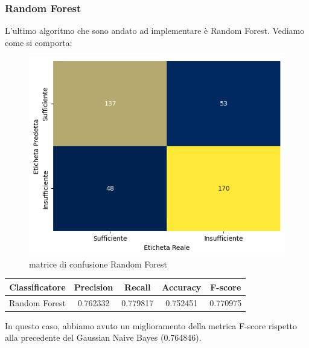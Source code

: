 \documentclass{article}
\begin{document}
\begin{titlepage}
        \subsubsection{Random Forest}
        L'ultimo algoritmo che sono andato ad implementare è Random Forest. Vediamo come si comporta:
        \begin{figure}[ht]
            \centering
            \includegraphics[width=0.6\linewidth]{confusion_matrix-RF.png}
            \caption{  matrice di confusione Random Forest}
            \label{fig:enter-label}
        \end{figure}
        \begin{center}
        \begin{tabular}{|c|c|c|c|c|}
            \hline
            \textbf{Classificatore} & \textbf{Precision} & \textbf{Recall} & \textbf{Accuracy}& \textbf{F-score}\\ \hline
            Random Forest & 0.762332 & 0.779817 & 0.752451 & 0.770975\\ \hline
        \end{tabular}
        \end{center}
        In questo caso, abbiamo avuto un miglioramento della metrica F-score rispetto alla precedente del Gaussian Naive Bayes (0.764846).

\end{titlepage}
\end{document}
